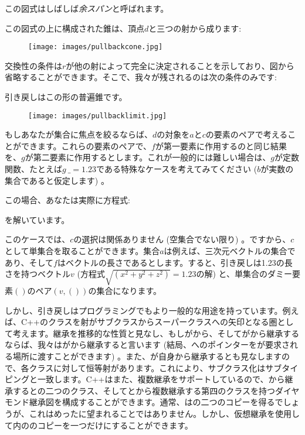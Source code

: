 
この図式はしばしば\emph{余スパン}と呼ばれます。

この図式の上に構成された錐は、頂点$d$と三つの射から成ります: 


\begin{figure}[H]
  \centering
  \texttt{[image: images/pullbackcone.jpg]}
\end{figure}

\noindent
交換性の条件は$r$が他の射によって完全に決定されることを示しており、図から省略することができます。そこで、我々が残されるのは次の条件のみです: 


引き戻しはこの形の普遍錐です。

\begin{figure}[H]
  \centering
  \texttt{[image: images/pullbacklimit.jpg]}
\end{figure}

\noindent
もしあなたが集合に焦点を絞るならば、$d$の対象を$a$と$c$の要素のペアで考えることができます。これらの要素のペアで、$f$が第一要素に作用するのと同じ結果を、$g$が第二要素に作用するとします。これが一般的には難しい場合は、$g$が定数関数、たとえば$g~\_ = 1.23$である特殊なケースを考えてみてください ($b$が実数の集合であると仮定します) 。

この場合、あなたは実際に方程式: 


を解いています。

このケースでは、$c$の選択は関係ありません (空集合でない限り) 。ですから、$c$として単集合を取ることができます。集合$a$は例えば、三次元ベクトルの集合であり、そして$f$はベクトルの長さであるとします。すると、引き戻しは1.23の長さを持つベクトル$v$ (方程式$\sqrt{(x^{2}+y^{2}+z^{2})} = 1.23$の解) と、単集合のダミー要素$()$のペア$(v, ())$の集合になります。

しかし、引き戻しはプログラミングでもより一般的な用途を持っています。例えば、C++のクラスを射がサブクラスからスーパークラスへの矢印となる圏として考えます。継承を推移的な性質と見なし、もしがから、そしてがから継承するならば、我々はがから継承すると言います (結局、へのポインターをが要求される場所に渡すことができます) 。また、が自身から継承するとも見なしますので、各クラスに対して恒等射があります。これにより、サブクラス化はサブタイピングと一致します。C++はまた、複数継承をサポートしているので、から継承するとの二つのクラス、そしてとから複数継承する第四のクラスを持つダイヤモンド継承図を構成することができます。通常、はの二つのコピーを得るでしょうが、これはめったに望まれることではありません。しかし、仮想継承を使用して内ののコピーを一つだけにすることができます。


